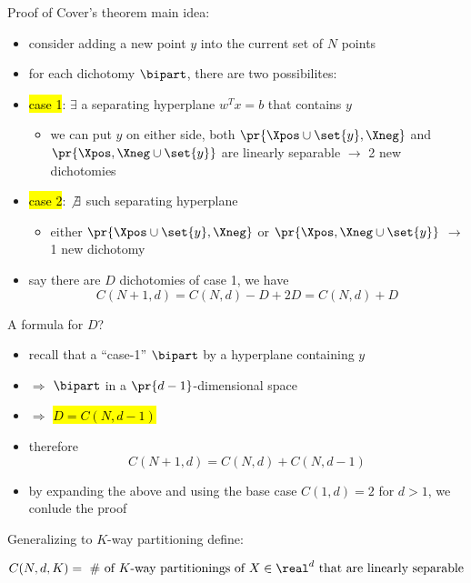 \begin{frame}{Proof of Cover's theorem}
  main idea:
  \begin{itemize}[<+->]
  \item consider adding a new point $y$ into the current set of $N$ points
  \item {for each dichotomy $\bipart$, there are two possibilites:}
  \item {\hl{case 1}: $\exists$ a separating hyperplane $w^T x = b$ that contains $y$
      \begin{itemize}
      \item we can put $y$ on either side, both $\pr{\Xpos \cup \set{y}, \Xneg}$ and $\pr{\Xpos, \Xneg \cup \set{y}}$ are linearly separable $\rightarrow$ 2 new dichotomies
      \end{itemize}
    }
  \item {\hl{case 2}: $\not\exists$ such separating hyperplane
      \begin{itemize}
      \item either $\pr{\Xpos \cup \set{y}, \Xneg}$ or  $\pr{\Xpos, \Xneg \cup \set{y}}$ \isls $\rightarrow$ 1 new dichotomy
      \end{itemize}
    }
  \item {say there are $D$ dichotomies of case 1, we have
      \[C(N+1, d) = C(N, d) - D + 2D = C(N, d) + D\]
    }
  \end{itemize}
\end{frame}

\begin{frame}{A formula for $D$?}
  \begin{itemize}[<+->]
  \item recall that a ``case-1'' $\bipart$ \isls by a hyperplane containing $y$
  \item $\Longrightarrow$ $\bipart$ \isls in a $\pr{d-1}$-dimensional space
  \item $\Longrightarrow$ \hl{$D=C(N, d-1)$}
  \item {therefore
      \[
        C(N+1, d) = C(N, d) + C(N, d-1)
      \]
    }
  \item by expanding the above and using the base case $C(1, d)=2$ for $d>1$, we conlude the proof
  \end{itemize}
\end{frame}

\begin{frame}{Generalizing to $K$-way partitioning}
  define:

  \[C(N, d, K) = \text{ \# of $K$-way partitionings of $X \in \real^d$ that are linearly separable}\]

\end{frame}

